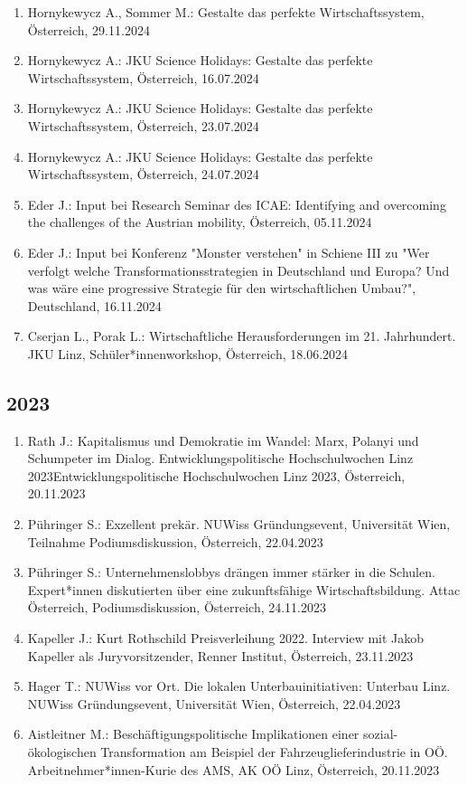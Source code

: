 \begin{enumerate}
	\item Hornykewycz A., Sommer M.: Gestalte das perfekte Wirtschaftssystem, Österreich, 29.11.2024
	\item Hornykewycz A.: JKU Science Holidays: Gestalte das perfekte Wirtschaftssystem, Österreich, 16.07.2024
	\item Hornykewycz A.: JKU Science Holidays: Gestalte das perfekte Wirtschaftssystem, Österreich, 23.07.2024
	\item Hornykewycz A.: JKU Science Holidays: Gestalte das perfekte Wirtschaftssystem, Österreich, 24.07.2024
	\item Eder J.: Input bei Research Seminar des ICAE: Identifying and overcoming the challenges of the Austrian mobility, Österreich, 05.11.2024
	\item Eder J.: Input bei Konferenz "Monster verstehen" in Schiene III zu "Wer verfolgt welche Transformationsstrategien in Deutschland und Europa? Und was wäre eine progressive Strategie für den wirtschaftlichen Umbau?", Deutschland, 16.11.2024
	\item Cserjan L., Porak L.: Wirtschaftliche Herausforderungen im 21. Jahrhundert. JKU Linz, Schüler*innenworkshop, Österreich, 18.06.2024
\end{enumerate}
\subsection*{2023}

\begin{enumerate}
	\item Rath J.: Kapitalismus und Demokratie im Wandel: Marx, Polanyi und Schumpeter im Dialog. Entwicklungspolitische Hochschulwochen Linz 2023Entwicklungspolitische Hochschulwochen Linz 2023, Österreich, 20.11.2023
	\item Pühringer S.: Exzellent prekär. NUWiss Gründungsevent, Universität Wien, Teilnahme Podiumsdiskussion, Österreich, 22.04.2023
	\item Pühringer S.: Unternehmenslobbys drängen immer stärker in die Schulen. Expert*innen diskutierten über eine zukunftsfähige Wirtschaftsbildung. Attac Österreich, Podiumsdiskussion, Österreich, 24.11.2023
	\item Kapeller J.: Kurt Rothschild Preisverleihung 2022. Interview mit Jakob Kapeller als Juryvorsitzender, Renner Institut, Österreich, 23.11.2023
	\item Hager T.: NUWiss vor Ort. Die lokalen Unterbauinitiativen: Unterbau Linz. NUWiss Gründungsevent, Universität Wien, Österreich, 22.04.2023
	\item Aistleitner M.: Beschäftigungspolitische Implikationen einer sozial-ökologischen Transformation am Beispiel der Fahrzeuglieferindustrie in OÖ. Arbeitnehmer*innen-Kurie des AMS, AK OÖ Linz, Österreich, 20.11.2023
\end{enumerate}

